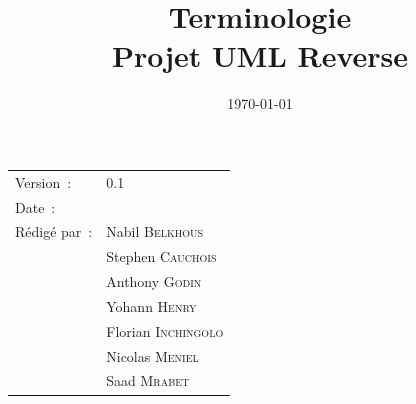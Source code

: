\documentclass[hidelinks, 10pt,a4paper]{article}
\title{\bfseries Terminologie\\Projet UML Reverse}
\begin{document}
\maketitle
\begin{center}
\begin{tabular}{ll}
  Version~: & 0.1\\[.5em]
  Date~: & \date{\today}\\[.5em]
  Rédigé par~: & Nabil \textsc{Belkhous}\\
               & Stephen \textsc{Cauchois}\\
               & Anthony \textsc{Godin}\\
               & Yohann \textsc{Henry}\\
               & Florian \textsc{Inchingolo}\\
               & Nicolas \textsc{Meniel}\\
               & Saad \textsc{Mrabet}\\[.5em]

\end{tabular}
\end{center}

\newpage
\end{document}
